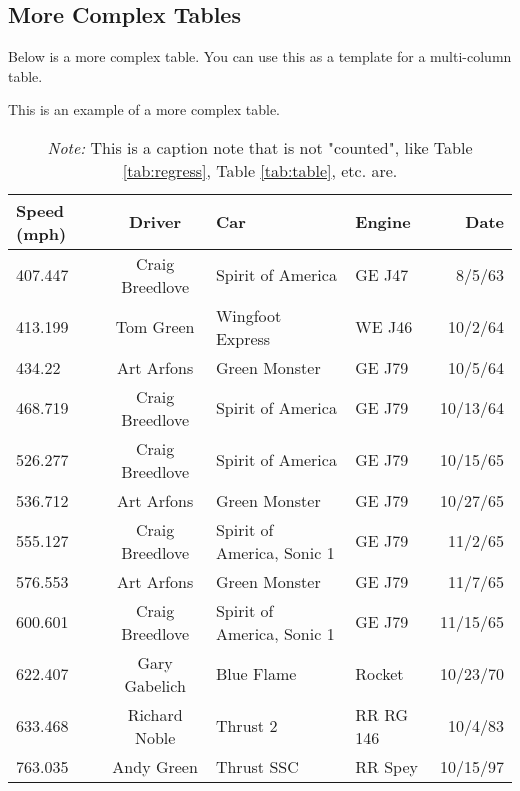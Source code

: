 \documentclass[10pt]{article}
\begin{document}
\subsection*{More Complex Tables}
Below is a more complex table. You can use this as a template for a multi-column table. 

\begin{table}[H]
\centering %
\caption{This is an example of a more complex table.}
\label{tab:wide}
\begin{tabular}{l c l l r} %
Speed (mph) & Driver          & Car                        & Engine    & Date     \\
\toprule
407.447     & Craig Breedlove & Spirit of America          & GE J47    & 8/5/63   \\
413.199     & Tom Green       & Wingfoot Express           & WE J46    & 10/2/64  \\
434.22      & Art Arfons      & Green Monster              & GE J79    & 10/5/64  \\
468.719     & Craig Breedlove & Spirit of America          & GE J79    & 10/13/64 \\
526.277     & Craig Breedlove & Spirit of America          & GE J79    & 10/15/65 \\
536.712     & Art Arfons      & Green Monster              & GE J79    & 10/27/65 \\
555.127     & Craig Breedlove & Spirit of America, Sonic 1 & GE J79    & 11/2/65  \\
576.553     & Art Arfons      & Green Monster              & GE J79    & 11/7/65  \\
600.601     & Craig Breedlove & Spirit of America, Sonic 1 & GE J79    & 11/15/65 \\
622.407     & Gary Gabelich   & Blue Flame                 & Rocket    & 10/23/70 \\
633.468     & Richard Noble   & Thrust 2                   & RR RG 146 & 10/4/83  \\
763.035     & Andy Green      & Thrust SSC                 & RR Spey   & 10/15/97\\
\bottomrule
\end{tabular}

\vspace{2mm}
\caption*{\textit{Note:} This is a caption note that is not "counted", like Table 
\ref{tab:regress}, Table \ref{tab:table}, etc. are.}
\end{table}
\end{document}
